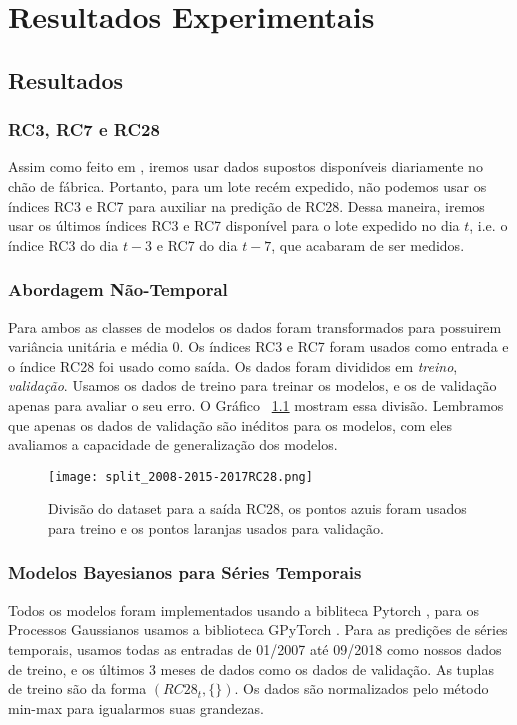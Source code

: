 
\chapter{Resultados Experimentais }
\label{cap:resultados}

\section{Resultados}


\subsection{RC3, RC7 e RC28}

Assim como feito em \cite{greciaLin}, iremos usar dados supostos disponíveis diariamente no chão de fábrica. Portanto, para um lote recém expedido,
não podemos usar os índices RC3 e RC7 para auxiliar na predição de RC28. Dessa maneira, iremos usar os últimos índices RC3 e RC7 disponível para o lote expedido no dia $t$,
i.e. o índice RC3 do dia $t-3$ e RC7 do dia $t-7$, que acabaram de ser medidos. \\


\subsection{Abordagem Não-Temporal}

 Para ambos as classes de modelos os dados foram transformados para possuirem variância
unitária e média 0. Os índices RC3 e RC7 foram usados como entrada e o índice
RC28 foi usado como saída. Os dados foram divididos em
\textit{treino}, \textit{validação}. Usamos os dados de treino 
para treinar os
modelos, e os de validação apenas para avaliar o seu erro. O Gráfico
~\ref{fig:divrc28} mostram essa divisão. Lembramos que apenas os dados de
validação são inéditos para os modelos, com eles avaliamos a capacidade de
generalização dos modelos. 


\begin{figure}[H]
  \centering
\texttt{[image: split\_2008-2015-2017RC28.png]}
\caption{Divisão do dataset para a saída RC28, os pontos azuis foram usados para
treino e os pontos laranjas usados para validação.}
  \label{fig:divrc28}
\end{figure}


\subsection{Modelos Bayesianos para Séries Temporais}


Todos os modelos foram implementados usando a bibliteca Pytorch \cite{pytorch}, para os Processos Gaussianos usamos a biblioteca GPyTorch \cite{gpytorch}. Para as predições de séries temporais, usamos todas as entradas de 01/2007 até 09/2018 como nossos dados de treino, e os últimos 3 meses de dados como os dados de validação. As tuplas de treino são da forma $(RC28_{t},\{\})$. Os dados são normalizados pelo método min-max para igualarmos suas grandezas. 




